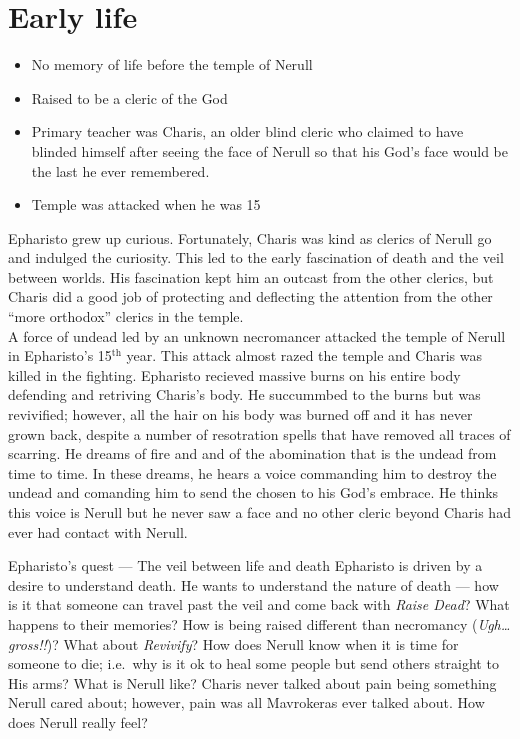 \documentclass[10pt,twoside,twocolumn,openany]{book}
\begin{document}
\section{Early life}
\begin{itemize}
\item No memory of life before the temple of Nerull
\item Raised to be a cleric of the God
\item Primary teacher was Charis, an older blind cleric who claimed to have blinded himself after seeing the face of Nerull so that his God's face would be the last he ever remembered.
\item Temple was attacked when he was 15
\end{itemize}

Epharisto grew up curious. Fortunately, Charis was kind as clerics of Nerull go and indulged the curiosity.
This led to the early fascination of death and the veil between worlds.
His fascination kept him an outcast from the other clerics, but Charis did a good job of protecting and deflecting the attention from the other ``more orthodox'' clerics in the temple. \\

A force of undead led by an unknown necromancer attacked the temple of Nerull in Epharisto's 15$^\textrm{th}$ year.
This attack almost razed the temple and Charis was killed in the fighting.
Epharisto recieved massive burns on his entire body defending and retriving Charis's body.
He succummbed to the burns but was revivified; however, all the hair on his body was burned off and it has never grown back, despite a number of resotration spells that have removed all traces of scarring.
He dreams of fire and and of the abomination that is the undead from time to time.
In these dreams, he hears a voice commanding him to destroy the undead and comanding him to send the chosen to his God's embrace.
He thinks this voice is Nerull but he never saw a face and no other cleric beyond Charis had ever had contact with Nerull.
\begin{commentbox}{Epharisto's quest --- The veil between life and death}
  Epharisto is driven by a desire to understand death.
  He wants to understand the nature of death --- how is it that someone can travel past the veil and come back with \emph{Raise Dead}?
  What happens to their memories?
  How is being raised different than necromancy (\emph{Ugh\ldots gross!!})?
  What about \emph{Revivify}?
  How does Nerull know when it is time for someone to die; i.e.\ why is it ok to heal some people but send others straight to His arms?
  What is Nerull like?
  Charis never talked about pain being something Nerull cared about; however, pain was all Mavrokeras ever talked about.
  How does Nerull really feel?
\end{commentbox}
\end{document}
